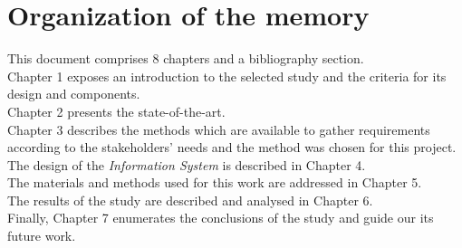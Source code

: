 




\section{Organization of the memory}

This document comprises 8 chapters and a bibliography section.\\

Chapter 1 exposes an introduction to the selected study and the criteria for its design and components.\\

Chapter 2 presents the state-of-the-art.\\

Chapter 3 describes the methods which are available to gather requirements according to the stakeholders' needs and the method was chosen for this project.\\

The design of the \textit{Information System} \cite{information_system, information_system_architecture} is described in Chapter 4.\\

The materials and methods used for this work are addressed in Chapter 5.\\

The results of the study are described and analysed in Chapter 6.\\

Finally, Chapter 7 enumerates the conclusions of the study and guide our its future work.\\

\newpage
\newpage
